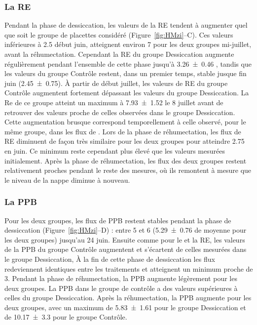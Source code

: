 \subsubsection{La RE}

Pendant la phase de dessiccation, les valeurs de la RE tendent à augmenter quel que soit le groupe de placettes considéré (Figure~\ref{fig:HMzi}--C).
Ces valeurs inférieures à \SI{2.5}{\uml} début juin, atteignent environ \SI{7}{\uml} pour les deux groupes mi-juillet, avant la réhumectation.
Cependant la RE du groupe Dessiccation augmente régulièrement pendant l'ensemble de cette phase jusqu'à \SI{3.26(046)}{\uml} , tandis que les valeurs du groupe Contrôle restent, dans un premier temps, stable jusque fin juin (\SI{2.45(075)}{\uml}).
À partir de début juillet, les valeurs de RE du groupe Contrôle augmentent fortement dépassant les valeurs du groupe Dessiccation.
La Re de ce groupe atteint un maximum à \SI{7.93(152)}{\uml} le 8 juillet avant de retrouver des valeurs proche de celles observées dans le groupe Dessiccation.
Cette augmentation brusque correspond temporellement à celle observé, pour le même groupe, dans les flux de \chh.
Lors de la phase de réhumectation, les flux de RE diminuent de façon très similaire pour les deux groupes pour atteindre \SI{2.75}{\uml} en juin.
Ce minimum reste cependant plus élevé que les valeurs mesurées initialement.
Après la phase de réhumectation, les flux des deux groupes restent relativement proches pendant le reste des mesures, où ils remontent à mesure que le niveau de la nappe diminue à nouveau.

\subsubsection{La PPB}

Pour les deux groupes, les flux de PPB restent stables pendant la phase de dessiccation (Figure~\ref{fig:HMzi}--D) :
entre 5 et \SI{6}{\uml} (\SI{5.29(076)}{\uml} de moyenne pour les deux groupes) jusqu'au 24 juin.
Ensuite comme pour le \chh et la RE, les valeurs de la PPB du groupe Contrôle augmentent et s'écartent de celles mesurées dans le groupe Dessiccation,
À la fin de cette phase de dessiccation les flux redeviennent identiques entre les traitements et atteignent un minimum proche de \SI{3}{\uml}.
Pendant la phase de réhumectation, la PPB augmente légèrement pour les deux groupes.
La PPB dans le groupe de contrôle a des valeurs supérieures à celles du groupe Dessiccation.
Après la réhumectation, la PPB augmente pour les deux groupes, avec un maximum de \SI{5.83(161)}{\uml} pour le groupe Dessiccation et de \SI{10.17(330)}{\uml} pour le groupe Contrôle.

